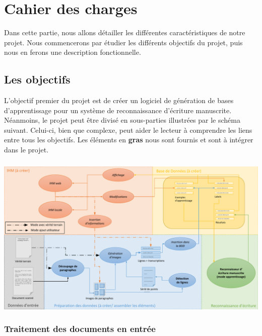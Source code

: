 \chapter{Cahier des charges}

Dans cette partie, nous allons détailler les différentes caractéristiques de notre projet.
Nous commencerons par étudier les différents objectifs du projet, puis nous en ferons
une description fonctionnelle.

\section{Les objectifs}

L’objectif premier du projet est de créer un logiciel de génération de bases d’apprentissage
pour un système de reconnaissance d’écriture manuscrite. Néanmoins, le projet peut être divisé
en sous-parties illustrées par le schéma suivant. Celui-ci, bien que complexe, peut aider le
lecteur à comprendre les liens entre tous les objectifs. Les éléments en \textbf{gras} nous
sont fournis et sont à intégrer dans le projet.

\paragraph{}
\begin{mdframed}[frametitle={Schéma résumant les différents aspects du projet}, innerbottommargin=10]
\begin{center}
\includegraphics[width=\linewidth]{schema.pdf}
\end{center}
\end{mdframed}

\subsection{Traitement des documents en entrée}


